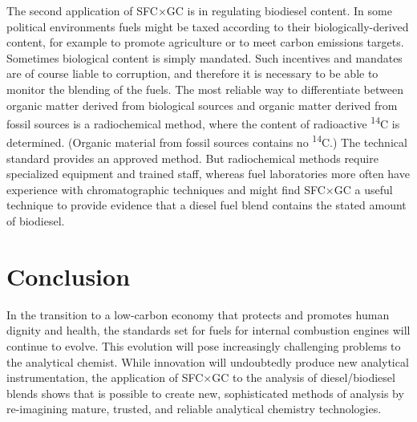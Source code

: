 The second application of SFC×GC is in regulating biodiesel content. In some
political environments fuels might be taxed according to their
biologically-derived content, for example to promote agriculture or to meet
carbon emissions targets. Sometimes biological content is simply mandated. Such
incentives and mandates are of course liable to corruption, and therefore it is
necessary to be able to monitor the blending of the fuels. The most
reliable way to differentiate between organic matter derived from biological
sources and organic matter derived from fossil sources is a radiochemical
method, where the content of radioactive \textsuperscript{14}C is determined.
(Organic material from fossil sources contains no \textsuperscript{14}C.) The
technical standard  provides an approved method. But radiochemical
methods require specialized equipment and trained staff, whereas fuel
laboratories more often have experience with chromatographic techniques and
might find SFC×GC a useful technique to provide evidence that a diesel fuel
blend contains the stated amount of biodiesel.

\section{Conclusion}

In the transition to a low-carbon economy that protects and promotes human
dignity and health, the standards set for fuels for internal combustion engines
will continue to evolve. This evolution will pose increasingly challenging
problems to the analytical chemist. While innovation will undoubtedly produce
new analytical instrumentation, the application of SFC×GC to the analysis of
diesel/biodiesel blends shows that is possible to create new, sophisticated
methods of analysis by re-imagining mature, trusted, and reliable analytical
chemistry technologies.


\todos